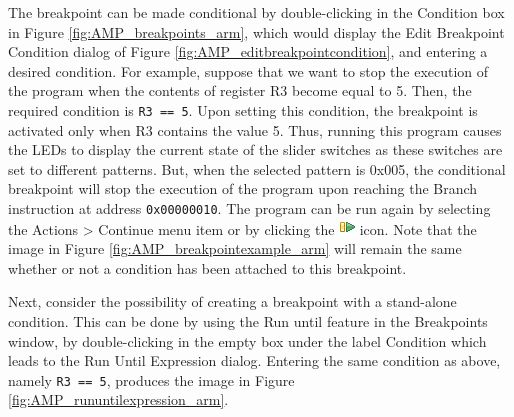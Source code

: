 \documentclass[11pt, twoside, pdftex]{article}
\begin{document}
The breakpoint can be made conditional by double-clicking in
the {\sf Condition} box in Figure \ref{fig:AMP_breakpoints_arm}, which would display the
Edit Breakpoint Condition dialog of Figure \ref{fig:AMP_editbreakpointcondition}, and entering a
desired condition. For example, suppose that we want to stop the
execution of the program when the contents of register R3
become equal to 5. Then, the required condition is
\texttt{R3 == 5}. Upon setting this condition, the breakpoint
is activated only when R3 contains the value 5.
Thus, running this program causes the 
LEDs to display the current state of the slider switches as these
switches are set to different patterns. But, when the selected
pattern is 0x005, the conditional breakpoint will stop the
execution of the program upon reaching the Branch instruction
at address \texttt{0x00000010}. 
The program can be run again by selecting the 
\textsf{Actions > Continue} menu item or by clicking the \includegraphics{toolbar/continue.png} icon.  
Note that the image in Figure \ref{fig:AMP_breakpointexample_arm} will remain the same whether
or not a condition has been attached to this breakpoint.

\newpage 
Next, consider the possibility of creating a breakpoint with a
stand-alone condition. This can be done by using the 
{\sf Run until} feature in the Breakpoints window, by
double-clicking in the empty box under the label {\sf Condition}
which leads to the {\sf Run Until Expression} dialog.
Entering the same condition as above, namely \texttt{R3 == 5},
produces the image in Figure \ref{fig:AMP_rununtilexpression_arm}.
\end{document}
